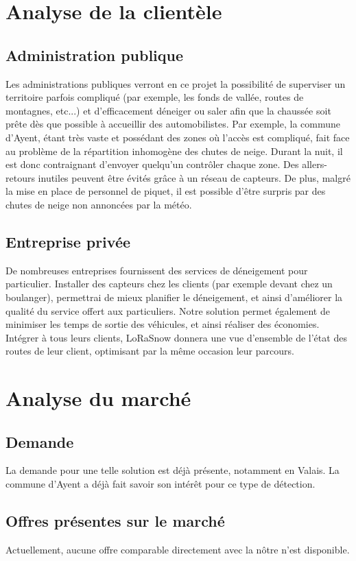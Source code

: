 \section{Analyse de la clientèle}
\subsection{Administration publique}
Les administrations publiques verront en ce projet la possibilité de superviser
un territoire parfois compliqué (par exemple, les fonds de vallée,
routes de montagnes, etc...) et d'efficacement déneiger ou saler
afin que la chaussée soit prête dès que possible à accueillir des automobilistes.
Par exemple, la commune d'Ayent, étant très vaste et possédant des zones
où l'accès est compliqué, fait face au problème de la répartition inhomogène
des chutes de neige. Durant la nuit, il est donc contraignant d'envoyer
quelqu'un contrôler chaque zone. Des allers-retours inutiles peuvent être
évités grâce à un réseau de capteurs.
De plus, malgré la mise en place de personnel de piquet, il est possible
d'être surpris par des chutes de neige non annoncées par la météo.

\subsection{Entreprise privée}
De nombreuses entreprises fournissent des services de déneigement pour particulier.
Installer des capteurs chez les clients (par exemple devant chez un boulanger),
permettrai de mieux planifier le déneigement, et ainsi d'améliorer la qualité
du service offert aux particuliers.
Notre solution permet également de minimiser les temps de sortie des véhicules,
et ainsi réaliser des économies.
Intégrer à tous leurs clients, LoRaSnow donnera une vue d'ensemble de l'état
des routes de leur client, optimisant par la même occasion leur parcours.

\section{Analyse du marché}
\subsection{Demande}
La demande pour une telle solution est déjà présente, notamment en Valais.
La commune d'Ayent a déjà fait savoir son intérêt pour ce type de détection.

\subsection{Offres présentes sur le marché}
Actuellement, aucune offre comparable directement avec la nôtre n'est disponible.


